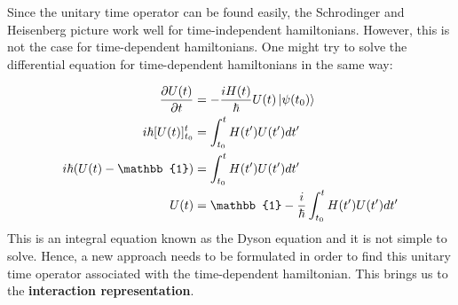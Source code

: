 \documentclass{article}
\begin{document}
\begin{flushleft}
Since the unitary time operator can be found easily, the Schrodinger and Heisenberg picture work well for time-independent hamiltonians. However, this is not the case for time-dependent hamiltonians. One might try to solve the differential equation for time-dependent hamiltonians in the same way:

\begin{align*}
     \frac{\partial U(t)}{\partial t}&=-\frac{iH(t)}{\hbar}U(t)\ket{\psi(t_0)}\\
     i\hbar[U(t)]_{t_0}^t&=\int_{t_0}^tH(t')U(t')dt'\\
     i\hbar(U(t)-\mathbb{1})&=\int_{t_0}^tH(t')U(t')dt'\\
     U(t)&=\mathbb{1}-\frac{i}{\hbar}\int_{t_0}^tH(t')U(t')dt'
     \end{align*}
This is an integral equation known as the Dyson equation and it is not simple to solve. Hence, a new approach needs to be formulated in order to find this unitary time operator associated with the time-dependent hamiltonian. This brings us to the \textbf{interaction representation}.\\[.5cm]


\end{flushleft}
\end{document}
